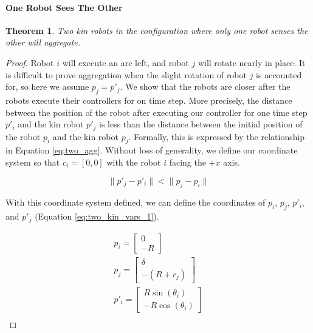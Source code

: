 \documentclass[conference]{IEEEtran}
\newtheorem{theorem}{Theorem}
\begin{document}
    \paragraph{One Robot Sees The Other}
    \begin{theorem} \label{thm:one_robot_sees_the_other}
      Two kin robots in the configuration where only one robot senses the other will aggregate.
    \end{theorem}
    \begin{proof}

    Robot $i$ will execute an arc left, and robot $j$ will rotate nearly in place. It is difficult to prove aggregation when the slight rotation of robot $j$ is accounted for, so here we assume $p_j = p'_j$. We show that the robots are closer after the robots execute their controllers for on time step. More precisely, the distance between the position of the robot after executing our controller for one time step $p'_i$ and the kin robot $p'_j$ is less than the distance between the initial position of the robot $p_i$ and the kin robot $p_j$. Formally, this is expressed by the relationship in Equation \eqref{eq:two_agg}. Without loss of generality, we define our coordinate system so that $c_i=[0,0]$ with the robot $i$ facing the $+x$ axis.

    \begin{equation} \label{eq:two_agg}
      \lVert p'_j - p'_i \rVert < \lVert p_j - p_i \rVert
    \end{equation}

    With this coordinate system defined, we can define the coordinates of $p_i$, $p_j$, $p'_i$, and $p'_j$ (Equation \eqref{eq:two_kin_vars_1}).

    \begin{equation} \label{eq:two_kin_vars_1}
      \begin{split}
        p_i = \begin{bmatrix}0 \\ -R\end{bmatrix} \\
        p_j = \begin{bmatrix}\delta \\ -(R+r_j)\end{bmatrix} \\
        p'_i = \begin{bmatrix}R\sin(\theta_i) \\ -R\cos(\theta_i)\end{bmatrix} \\
      \end{split}
    \end{equation}


\end{proof}
\end{document}
